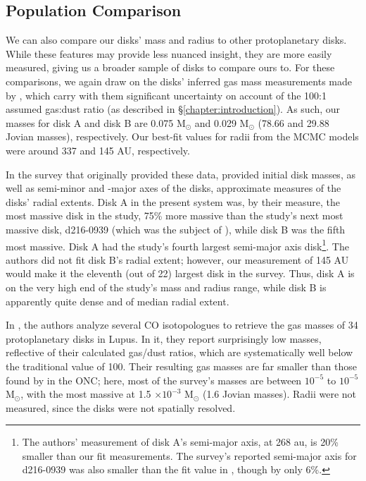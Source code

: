 \subsection{Population Comparison}

We can also compare our disks' mass and radius to other protoplanetary disks. While these features may provide less nuanced insight, they are more easily measured, giving us a broader sample of disks to compare ours to. For these comparisons, we again draw on the disks' inferred gas mass measurements made by \citet{Williams2014}, which carry with them significant uncertainty on account of the 100:1 assumed gas:dust ratio (as described in \S\ref{chapter:introduction}). As such, our masses for disk A and disk B are 0.075 M$_\odot$ and 0.029 M$_\odot$ (78.66 and 29.88 Jovian masses), respectively. Our best-fit values for radii from the MCMC models were around 337 and 145 AU, respectively.

In the survey that originally provided these data, \citet{Mann2014} provided initial disk masses, as well as semi-minor and -major axes of the disks, approximate measures of the disks' radial extents. Disk A in the present system was, by their measure, the most massive disk in the study, 75\% more massive than the study's next most massive disk, d216-0939 (which was the subject of \citet{Factor2017}), while disk B was the fifth most massive. Disk A had the study's fourth largest semi-major axis disk\footnote{The authors' measurement of disk A's semi-major axis, at 268 au, is 20\% smaller than our fit measurements. The survey's reported semi-major axis for d216-0939 was also smaller than the fit value in \citet{Factor2017}, though by only 6\%.}. The authors did not fit disk B's radial extent; however, our measurement of 145 AU would make it the eleventh (out of 22) largest disk in the survey. Thus, disk A is on the very high end of the study's mass and radius range, while disk B is apparently quite dense and of median radial extent.


In \citet{Miotello2017}, the authors analyze several CO isotopologues to retrieve the gas masses of 34 protoplanetary disks in Lupus. In it, they report surprisingly low masses, reflective of their calculated gas/dust ratios, which are systematically well below the traditional value of 100. Their resulting gas masses are far smaller than those found by \cite{Mann2014} in the ONC; here, most of the survey's masses are between $10^{-5}$ to $10^{-5}$ M$_\odot$, with the most massive at 1.5 $\times 10^{-3}$ M$_\odot$ (1.6 Jovian masses). Radii were not measured, since the disks were not spatially resolved.


